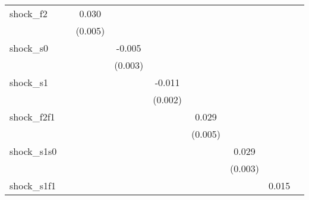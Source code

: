 {\begin{tabular}{l*{8}{c}}
\addlinespace
shock\_f2    &                     &       0.030\sym{***}&                     &                     &                     &                     &                     &                     \\
            &                     &     (0.005)         &                     &                     &                     &                     &                     &                     \\
\addlinespace
shock\_s0    &                     &                     &      -0.005         &                     &                     &                     &                     &                     \\
            &                     &                     &     (0.003)         &                     &                     &                     &                     &                     \\
\addlinespace
shock\_s1    &                     &                     &                     &      -0.011\sym{***}&                     &                     &                     &                     \\
            &                     &                     &                     &     (0.002)         &                     &                     &                     &                     \\
\addlinespace
shock\_f2f1  &                     &                     &                     &                     &       0.029\sym{***}&                     &                     &                     \\
            &                     &                     &                     &                     &     (0.005)         &                     &                     &                     \\
\addlinespace
shock\_s1s0  &                     &                     &                     &                     &                     &       0.029\sym{***}&                     &                     \\
            &                     &                     &                     &                     &                     &     (0.003)         &                     &                     \\
\addlinespace
shock\_s1f1  &                     &                     &                     &                     &                     &                     &       0.015\sym{***}&                     \\

\end{tabular}}
